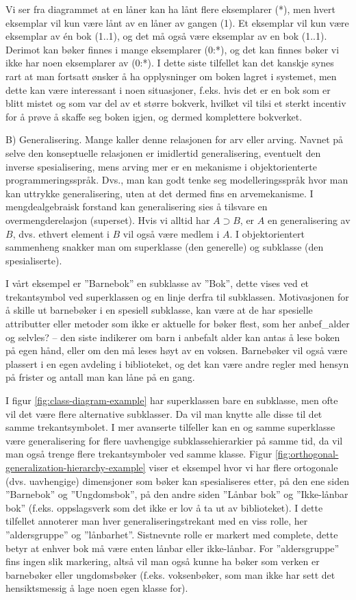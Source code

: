 Vi ser fra diagrammet at en låner kan ha lånt flere eksemplarer (*), men hvert eksemplar vil kun være lånt av en låner av gangen (1). Et eksemplar vil kun være eksemplar av én bok (1..1), og det må også være eksemplar av en bok (1..1). Derimot kan bøker finnes i mange eksemplarer (0:*), og det kan finnes bøker vi ikke har noen eksemplarer av (0:*). I dette siste tilfellet kan det kanskje synes rart at man fortsatt ønsker å ha opplysninger om boken lagret i systemet, men dette kan være interessant i noen situasjoner, f.eks. hvis det er en bok som er blitt mistet og som var del av et større bokverk, hvilket vil tilsi et sterkt incentiv for å prøve å skaffe seg boken igjen, og dermed komplettere bokverket.

B) Generalisering. Mange kaller denne relasjonen for arv eller arving. Navnet på selve den konseptuelle relasjonen er imidlertid generalisering, eventuelt den inverse spesialisering, mens arving mer er en mekanisme i objektorienterte programmeringsspråk. Dvs., man kan godt tenke seg modelleringsspråk hvor man kan uttrykke generalisering, uten at det dermed fins en arvemekanisme. I mengdealgebraisk forstand kan generalisering sies å tilsvare en overmengderelasjon (superset). Hvis vi alltid har $ A \supset B $, er $ A $ en generalisering av $ B $, dvs. ethvert element i $ B $  vil også være medlem i $ A $. I objektorientert sammenheng snakker man om superklasse (den generelle) og subklasse (den spesialiserte).

I vårt eksempel er ”Barnebok” en subklasse av ”Bok”, dette vises ved et trekantsymbol ved superklassen og en linje derfra til subklassen. Motivasjonen for å skille ut barnebøker i en spesiell subklasse, kan være at de har spesielle attributter eller metoder som ikke er aktuelle for bøker flest, som her anbef\_alder og selvles? – den siste indikerer om barn i anbefalt alder kan antas å lese boken på egen hånd, eller om den må leses høyt av en voksen. Barnebøker vil også være plassert i en egen avdeling i biblioteket, og det kan være andre regler med hensyn på frister og antall man kan låne på en gang.

I figur \ref{fig:class-diagram-example} har superklassen bare en subklasse, men ofte vil det være flere alternative subklasser. Da vil man knytte alle disse til det samme trekantsymbolet. I mer avanserte tilfeller kan en og samme superklasse være generalisering for flere uavhengige subklassehierarkier på samme tid, da vil man også trenge flere trekantsymboler ved samme klasse. Figur \ref{fig:orthogonal-generalization-hierarchy-example} viser et eksempel hvor vi har flere ortogonale (dvs. uavhengige) dimensjoner som bøker kan spesialiseres etter, på den ene siden ”Barnebok” og ”Ungdomsbok”, på den andre siden ”Lånbar bok” og ”Ikke-lånbar bok” (f.eks. oppslagsverk som det ikke er lov å ta ut av biblioteket). I dette tilfellet annoterer man hver generaliseringstrekant med en viss rolle, her ”aldersgruppe” og ”lånbarhet”. Sistnevnte rolle er markert med {complete}, dette betyr at enhver bok må være enten lånbar eller ikke-lånbar. For ”aldersgruppe” fins ingen slik markering, altså vil man også kunne ha bøker som verken er barnebøker eller ungdomsbøker (f.eks. voksenbøker, som man ikke har sett det hensiktsmessig å lage noen egen klasse for).

